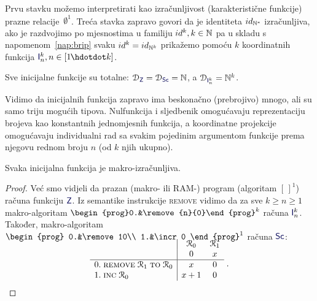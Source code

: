 Prvu stavku možemo interpretirati kao izračunljivost (karakteristične funkcije) prazne relacije~$\emptyset^1$. Treća stavka zapravo govori da je identiteta $id_{{\mathbb N}^*}$ izračunljiva, ako je razdvojimo po mjesnostima u familiju $id^k,k\in{\mathbb N}$ pa u skladu s napomenom~\ref{nap:brip} svaku $id^k=id_{{\mathbb N}^k}$ prikažemo pomoću $k$ koordinatnih funkcija $\f I_n^k,n\in[1\mspace{-1mu}\dd k]$.

\begin{napomena}[{name=[totalnost inicijalnih funkcija]}]\label{nap:inittot}
Sve inicijalne funkcije su totalne: $\dom{\f Z}=\dom{\f{Sc}}=\N$, a $\dom{\f I_n^k}=\N^k$.
\end{napomena}

Vidimo da inicijalnih funkcija zapravo ima beskonačno (prebrojivo) mnogo, ali su samo triju mogućih tipova. Nulfunkcija i sljedbenik omogućavaju reprezentaciju brojeva kao konstantnih jednomjesnih funkcija, a koordinatne projekcije omogućavaju individualni rad sa svakim pojedinim argumentom funkcije prema njegovu rednom broju $n$ (od $k$ njih ukupno).

\begin{propozicija}[{name=[makro-izračunljivost inicijalnih funkcija]}]\label{prop:initmacro}
Svaka inicijalna funkcija je makro-izračunljiva.
\end{propozicija}
\begin{proof}
    Već smo vidjeli da prazan (makro- ili RAM-\!) program (algoritam $[\,]^1$) računa funkciju $\f Z$. Iz semantike instrukcije \textsc{remove} vidimo da za sve $k\ge n\ge 1$ makro-algoritam $\begin{prog}0.&\remove{n}{0}\end{prog}^k$ računa $\f I_n^k$. Također, makro-algoritam $\begin{prog}
0.&\remove10\\
1.&\incr0
\end{prog}^1$ računa $\f{Sc}$:
\vspace{-0.3em}
\begin{equation}
    \begin{array}{r@{\;}l|cc}
\SwapAboveDisplaySkip
        & & \reg0 & \reg1 \\
        & & 0 & x\\\hline 
        0.&\remove10&x & 0\\
        1.&\incr0 & x+1 & 0
    \end{array}\text{\;.\qedhere}
\end{equation}
\end{proof}

